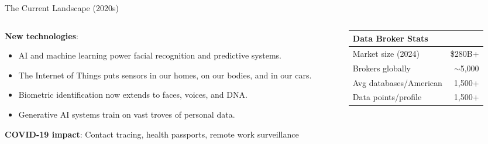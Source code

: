 ﻿\documentclass[aspectratio=169,11pt]{beamer}
\begin{document}
\begin{frame}{The Current Landscape (2020s)}
\begin{columns}[T]
\begin{column}{0.55\textwidth}
\textbf{New technologies}:
\begin{itemize}
    \item AI and machine learning power facial recognition and predictive systems.
    \item The Internet of Things puts sensors in our homes, on our bodies, and in our cars.
    \item Biometric identification now extends to faces, voices, and DNA.
    \item Generative AI systems train on vast troves of personal data.
\end{itemize}

\textbf{COVID-19 impact}: Contact tracing, health passports, remote work surveillance
\end{column}
\begin{column}{0.42\textwidth}
\begin{table}[h]
\centering
\scriptsize
\begin{tabular}{@{}lr@{}}
\toprule
\textbf{Data Broker Stats} & \\
\midrule
Market size (2024) & \$280B+ \\
Brokers globally & $\sim$5,000 \\
Avg databases/American & 1,500+ \\
Data points/profile & 1,500+ \\
\bottomrule
\end{tabular}
\end{table}
\end{column}
\end{columns}
\end{frame}
\end{document}
